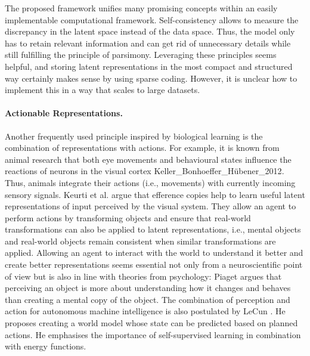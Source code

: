 The proposed framework unifies many promising concepts within an easily implementable computational framework. Self-consistency allows to measure the discrepancy in the latent space instead of the data space. Thus, the model only has to retain relevant information and can get rid of unnecessary details while still fulfilling the principle of parsimony. Leveraging these principles seems helpful, and storing latent representations in the most compact and structured way certainly makes sense by using sparse coding. However, it is unclear how to implement this in a way that scales to large datasets. 

\paragraph{Actionable Representations.} Another frequently used principle inspired by biological learning is the combination of representations with actions. For example, it is known from animal research that both eye movements and behavioural states influence the reactions of neurons in the visual cortex {Keller_Bonhoeffer_Hübener_2012}.
Thus, animals integrate their actions (i.e., movements) with currently incoming sensory signals.
Keurti et al.  argue that efference copies help to learn useful latent representations of input perceived by the visual system. They allow an agent to perform actions by transforming objects and ensure that real-world transformations can also be applied to latent representations, i.e., mental objects and real-world objects remain consistent when similar transformations are applied.
Allowing an agent to interact with the world to understand it better and create better representations seems essential not only from a neuroscientific point of view but is also in line with theories from psychology:
Piaget argues that perceiving an object is more about understanding how it changes and behaves than creating a mental copy of the object.
The combination of perception and action for autonomous machine intelligence is also postulated by LeCun . He proposes creating a world model whose state can be predicted based on planned actions. He emphasises the importance of self-supervised learning in combination with energy functions.


